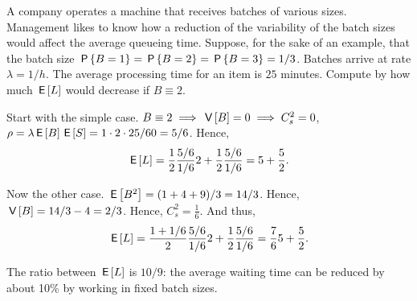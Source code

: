 \documentclass[stochastic-or.tex]{subfiles}
\begin{document}
\begin{exercise}\label{ex:64}
A company operates a machine that receives batches of various sizes.
Management likes to know how a reduction of the variability of the batch sizes would affect the average queueing time.
Suppose, for the sake of an example, that the batch size $\P{B=1} = \P{B=2} = \P{B=3} = 1/3$.
Batches arrive at rate $\lambda = 1/h$.
The average processing time for an item is $25$ minutes.
Compute by how much $\E\L$ would decrease if $B\equiv 2$.
\begin{solution}

 Start with the simple case.
 $B\equiv 2 \implies \V B=0 \implies C_s^2 = 0$,  $\rho=\lambda \E B \E S = 1\cdot 2 \cdot 25/60 = 5/6$. Hence,
 \begin{equation*}
 \E{\L} = \frac 12 \frac{5/6}{1/6} 2 + \frac 12 \frac{5/6}{1/6} = 5 + \frac52.
 \end{equation*}

Now the other case. $\E{B^2} = (1+4+9)/3 = 14/3$. Hence, $\V B=14/3 - 4=2/3$. Hence,
$C_s^2= \frac 16$.
And thus,
 \begin{equation*}
 \E{\L} = \frac {1+1/6}2 \frac{5/6}{1/6} 2 + \frac 12 \frac{5/6}{1/6} = \frac76 5 + \frac 52.
 \end{equation*}

 The ratio between $\E{\L}$ is $10/9$:  the average waiting time can be reduced by about  10\%  by working in fixed batch sizes.
\end{solution}
\end{exercise}


\end{document}
